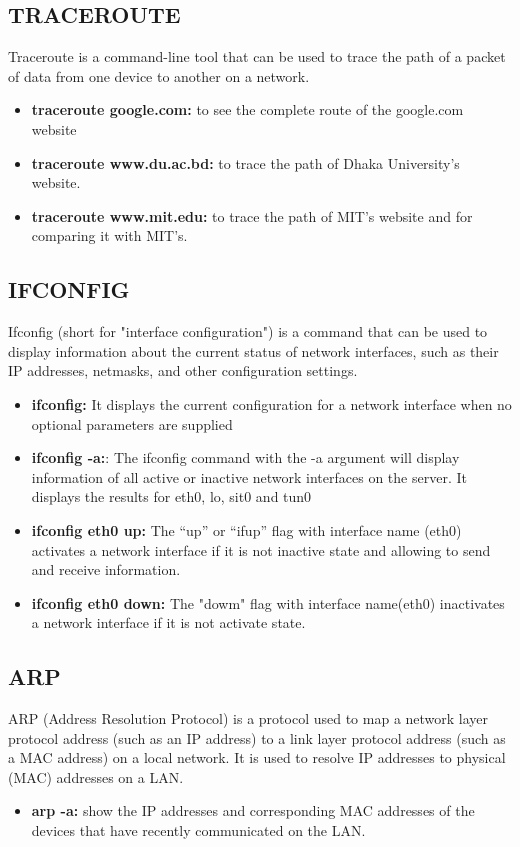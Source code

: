 \documentclass[11pt]{article}
\begin{document}
\subsection{TRACEROUTE}
Traceroute is a command-line tool that can be used to trace the path of a packet of data from one device to another on a network.
\begin{itemize}
    \item \textbf{traceroute google.com:} to see the complete route of the google.com website
    \item \textbf{traceroute www.du.ac.bd:} to trace the path of Dhaka University's website.
    \item \textbf{traceroute www.mit.edu:} to trace the path of MIT's website and for comparing it with MIT's.
\end{itemize} 

\subsection{IFCONFIG}
Ifconfig (short for "interface configuration") is a command that can be used to display information about the current status of network interfaces, such as their IP addresses, netmasks, and other configuration settings.
\begin{itemize}
    \item \textbf{ifconfig:} It displays the current configuration for a network interface when no optional parameters are supplied
    \item \textbf{ifconfig -a:}: The ifconfig command with the -a argument will display information of all active or inactive network interfaces on the server. It displays the results for eth0, lo, sit0 and tun0
    \item \textbf{ifconfig eth0 up:} The “up” or “ifup” flag with interface name (eth0) activates a network interface if it is not inactive state and allowing to send and receive information.
    \item \textbf{ifconfig eth0 down:} The "dowm" flag with interface name(eth0) inactivates a network interface if it is not activate state.
    \end{itemize}
\subsection{ARP}
ARP (Address Resolution Protocol) is a protocol used to map a network layer protocol address (such as an IP address) to a link layer protocol address (such as a MAC address) on a local network. It is used to resolve IP addresses to physical (MAC) addresses on a LAN.
\begin{itemize}
    \item \textbf{arp -a:} show the IP addresses and corresponding MAC addresses of the devices that have recently communicated on the LAN.
\end{itemize}
\end{document}
